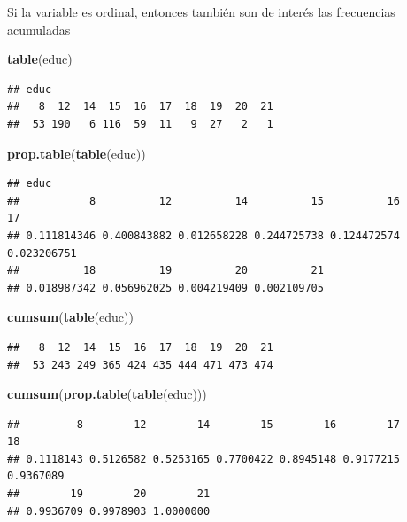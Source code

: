 \documentclass[]{book}
\newenvironment{Shaded}{\begin{snugshade}}{\end{snugshade}}
\newcommand{\KeywordTok}[1]{\textcolor[rgb]{0.13,0.29,0.53}{\textbf{#1}}}
\newcommand{\NormalTok}[1]{#1}
\begin{document}
Si la variable es ordinal, entonces también son de interés las
frecuencias acumuladas

\begin{Shaded}
\begin{Highlighting}[]
\KeywordTok{table}\NormalTok{(educ)}
\end{Highlighting}
\end{Shaded}

\begin{verbatim}
## educ
##   8  12  14  15  16  17  18  19  20  21 
##  53 190   6 116  59  11   9  27   2   1
\end{verbatim}

\begin{Shaded}
\begin{Highlighting}[]
\KeywordTok{prop.table}\NormalTok{(}\KeywordTok{table}\NormalTok{(educ))}
\end{Highlighting}
\end{Shaded}

\begin{verbatim}
## educ
##           8          12          14          15          16          17 
## 0.111814346 0.400843882 0.012658228 0.244725738 0.124472574 0.023206751 
##          18          19          20          21 
## 0.018987342 0.056962025 0.004219409 0.002109705
\end{verbatim}

\begin{Shaded}
\begin{Highlighting}[]
\KeywordTok{cumsum}\NormalTok{(}\KeywordTok{table}\NormalTok{(educ))}
\end{Highlighting}
\end{Shaded}

\begin{verbatim}
##   8  12  14  15  16  17  18  19  20  21 
##  53 243 249 365 424 435 444 471 473 474
\end{verbatim}

\begin{Shaded}
\begin{Highlighting}[]
\KeywordTok{cumsum}\NormalTok{(}\KeywordTok{prop.table}\NormalTok{(}\KeywordTok{table}\NormalTok{(educ)))}
\end{Highlighting}
\end{Shaded}

\begin{verbatim}
##         8        12        14        15        16        17        18 
## 0.1118143 0.5126582 0.5253165 0.7700422 0.8945148 0.9177215 0.9367089 
##        19        20        21 
## 0.9936709 0.9978903 1.0000000
\end{verbatim}
\end{document}
